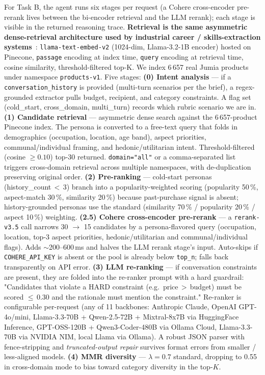 \documentclass[sigconf,nonacm,balance]{acmart}
\begin{document}
For Task B, the agent runs six stages per request (a Cohere
cross-encoder pre-rerank lives between the bi-encoder retrieval and
the LLM rerank); each stage is visible in the returned reasoning
trace. \textbf{Retrieval is the same asymmetric
dense-retrieval architecture used by industrial career / skills-extraction
systems}~\cite{esco-skills}: \texttt{llama-text-embed-v2}
(1024-dim, Llama-3.2-1B encoder) hosted on Pinecone, \texttt{passage}
encoding at index time, \texttt{query} encoding at retrieval time,
cosine similarity, threshold-filtered top-K. We index 6\,657 real Jumia
products under namespace \texttt{products-v1}. Five stages:
\textbf{(0) Intent analysis} --- if a \texttt{conversation\_history} is
provided (multi-turn scenarios per the brief), a regex-grounded extractor
pulls budget, recipient, and category constraints. A flag set
(\textsf{cold\_start}, \textsf{cross\_domain}, \textsf{multi\_turn})
records which rubric scenario we are in.
\textbf{(1) Candidate retrieval} --- asymmetric dense search against the
6\,657-product Pinecone index. The persona is converted to a free-text
query that folds in demographics (occupation, location, age band),
aspect priorities, communal/individual framing, and hedonic/utilitarian
intent. Threshold-filtered (cosine $\geq 0.10$) top-30 returned.
\texttt{domain="all"} or a comma-separated list triggers cross-domain
retrieval across multiple namespaces, with de-duplication preserving
original order.
\textbf{(2) Pre-ranking} --- cold-start personas (history\_count\,$<$\,3)
branch into a popularity-weighted scoring (popularity 50\,\%, aspect-match
30\,\%, similarity 20\,\%) because past-purchase signal is absent;
history-grounded personas use the standard
(similarity 70\,\% / popularity 20\,\% / aspect 10\,\%) weighting.
\textbf{(2.5) Cohere cross-encoder pre-rerank} --- a
\texttt{rerank-v3.5} call narrows 30 $\to$ 15 candidates by a
persona-flavored query (occupation, location, top-3 aspect priorities,
hedonic/utilitarian and communal/individual flags). Adds
$\sim$200--600\,ms and halves the LLM rerank stage's input.
Auto-skips if \texttt{COHERE\_API\_KEY} is absent or the pool is
already below \texttt{top\_n}; falls back transparently on API error.
\textbf{(3) LLM re-ranking} --- if conversation constraints are present,
they are folded into the re-ranker prompt with a hard guardrail:
"Candidates that violate a HARD constraint (e.g.\ price\,$>$\,budget)
must be scored $\leq$\,0.30 and the rationale must mention the
constraint." Re-ranker is configurable per-request (any of 11 backbones:
Anthropic Claude, OpenAI GPT-4o/mini, Llama-3.3-70B + Qwen-2.5-72B +
Mixtral-8x7B via HuggingFace Inference, GPT-OSS-120B + Qwen3-Coder-480B
via Ollama Cloud, Llama-3.3-70B via NVIDIA NIM, local Llama via Ollama).
A robust JSON parser with fence-stripping and \emph{truncated-output
repair} survives format errors from smaller / less-aligned models.
\textbf{(4) MMR diversity} --- $\lambda=0.7$ standard, dropping to 0.55
in cross-domain mode to bias toward category diversity in the top-$K$.
\end{document}
